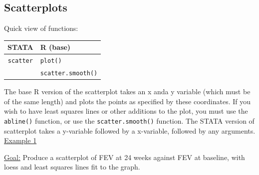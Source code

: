\documentclass[landscape]{article}
\begin{document}
\subsection{Scatterplots}
Quick view of functions:\\
\begin{tabular}{c|l}
STATA & R (base) \\
\hline
\texttt{scatter} & \texttt{plot()} \\
 & \texttt{scatter.smooth()}
\end{tabular}

The base R version of the scatterplot takes an x anda y variable (which must be of the same length) and plots the points as specified by these coordinates. If you wish to have least squares lines or other additions to the plot, you must use the \texttt{abline()} function, or use the \texttt{scatter.smooth()} function. The STATA version of scatterplot takes a y-variable followed by a x-variable, followed by any arguments. 
\newline
\noindent \underline{Example 1}

\underline{Goal:} Produce a scatterplot of FEV at 24 weeks against FEV at baseline, with loess and least squares lines fit to the graph.
\end{document}
